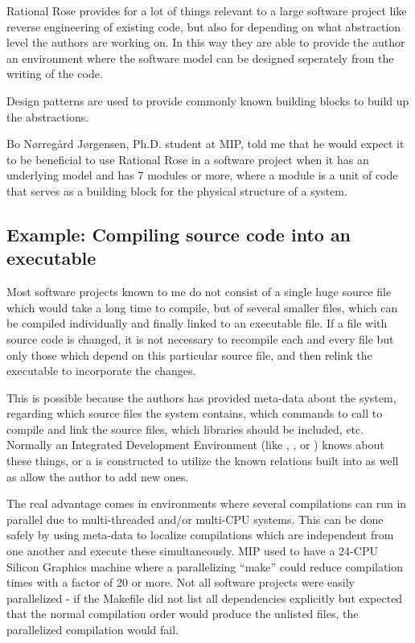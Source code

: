 Rational Rose provides for a lot of things relevant to a large
software project like reverse engineering of existing code, but also
for
 depending on what abstraction level the
authors are working on.  In this way they are able to provide the
author an environment where the software model can be designed
seperately from the writing of the code.

Design patterns are used to provide commonly known building blocks to
build up the abstractions.

Bo N{\o}rreg{\aa}rd J{\o}rgensen, Ph.D. student at MIP{}, told
me that he would expect it to be beneficial to use Rational
Rose in a software project when it has an underlying model
and has 7 modules or more, where a module is a unit of code
that serves as a building block for the physical structure
of a system.
                       

\subsection{Example: Compiling source code into an executable}
\label{sec:compiling-source-into-an-executable}

Most software projects known to me do not consist of a single huge
source file which would take a long time to compile, but of several smaller
files, which can be compiled individually and finally linked to an executable
file.  If a file with source code is changed, it is not necessary to
recompile each and every file but only those which depend on this
particular source file, and then relink the executable to incorporate
the changes.

This is possible because the authors has provided meta-data about the
system, regarding which source files the system contains, which
commands to call to compile and link the source files, which libraries
should be included, etc.  Normally an Integrated Development
Environment (like , , or ) knows about these things, or a
 is constructed
to utilize the known relations built into  as well
as allow the author to add new ones.

The real advantage comes in environments where several compilations
can run in parallel due to multi-threaded and/or multi-CPU systems.
This can be done safely by using meta-data to localize compilations
which are independent from one another and execute these
simultaneously.  MIP used to have a 24-CPU Silicon Graphics machine
where a parallelizing ``make'' could reduce compilation times with a
factor of 20 or more.  Not all software projects were easily
parallelized - if the Makefile did not list all dependencies
explicitly but expected that the normal compilation order would
produce the unlisted files, the parallelized compilation would fail.



